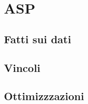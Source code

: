 \section{ASP}\label{sec:asp}

\subsection{Fatti sui dati}\label{sec:facts}
\subsection{Vincoli}\label{sec:constraints}
\subsection{Ottimizzzazioni}\label{sec:optimizations}